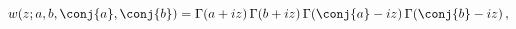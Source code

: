 \[w(z;a,b,\conj{a},\conj{b})=\mathop{\Gamma\/}\nolimits\!\left(a+iz\right)%
\mathop{\Gamma\/}\nolimits\!\left(b+iz\right)\mathop{\Gamma\/}\nolimits\!\left%
(\conj{a}-iz\right)\mathop{\Gamma\/}\nolimits\!\left(\conj{b}-iz\right),\]